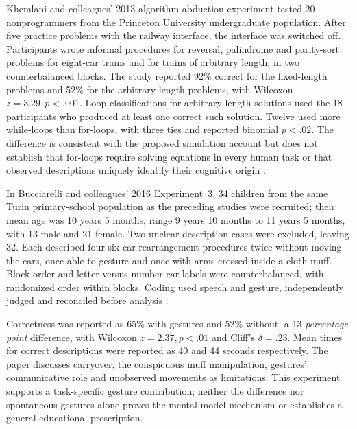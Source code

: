 Khemlani and colleagues' 2013 algorithm-abduction experiment tested
20 nonprogrammers from the Princeton University undergraduate population.
After five practice problems with the railway interface,
the interface was switched off. Participants wrote informal procedures
for reversal, palindrome and parity-sort problems for eight-car trains and
for trains of arbitrary length, in two counterbalanced blocks. The study
reported 92\% correct for the fixed-length problems and 52\% for the
arbitrary-length problems, with Wilcoxon \(z=3.29,p<.001\).
Loop classifications for arbitrary-length solutions used the 18
participants who produced at least one correct such solution. Twelve
used more while-loops than for-loops, with three ties and reported
binomial \(p<.02\). The difference is consistent with the proposed
simulation account but does not establish that for-loops require solving
equations in every human task or that observed descriptions uniquely
identify their cognitive origin
\cite[main paper pp.~3--6 and SI Text S3--S4]{KhemlaniEtAl2013Kinematic}.

In Bucciarelli and colleagues' 2016 Experiment~3, 34 children from the
same Turin primary-school population as the preceding studies were
recruited; their mean age was 10 years 5 months, range 9 years 10 months
to 11 years 5 months, with 13 male and 21 female. Two unclear-description
cases were excluded, leaving 32. Each described four six-car
rearrangement procedures twice without moving the cars, once able to
gesture and once with arms crossed inside a cloth muff. Block order and
letter-versus-number car labels were counterbalanced, with randomized
order within blocks. Coding used speech and gesture, independently
judged and reconciled before analysis
\cite[early-online pp.~12--17]{BucciarelliEtAl2016Algorithms}.

Correctness was reported as 65\% with gestures and 52\% without,
a 13-\emph{percentage-point} difference, with Wilcoxon
\(z=2.37,p<.01\) and Cliff's \(\delta=.23\). Mean times for
correct descriptions were reported as 40 and 44 seconds respectively.
The paper discusses carryover, the conspicuous muff manipulation,
gestures' communicative role and unobserved movements as limitations.
This experiment supports a task-specific gesture contribution; neither
the difference nor spontaneous gestures alone proves the mental-model
mechanism or establishes a general educational prescription.

